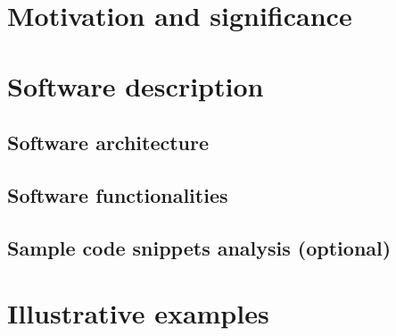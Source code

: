 \documentclass[preprint,12pt, a4paper]{elsarticle}
\begin{document}

\section{Motivation and significance}



\section{Software description}

\subsection{Software architecture}


\subsection{Software functionalities}


\subsection{Sample code snippets analysis (optional)}



\section{Illustrative examples}


\end{document}
